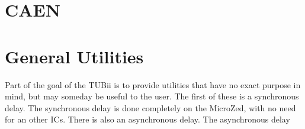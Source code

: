 \documentclass[11pt,a4paper]{article}
\begin{document}
\section{CAEN}

\section{General Utilities}
Part of the goal of the TUBii is to provide utilities that have no exact purpose in mind, but may someday be useful to the user. The first of these is a synchronous delay. The synchronous delay is done completely on the MicroZed, with no need for an other ICs.  There is also an asynchronous delay. The asynchronous delay  
\end{document}
